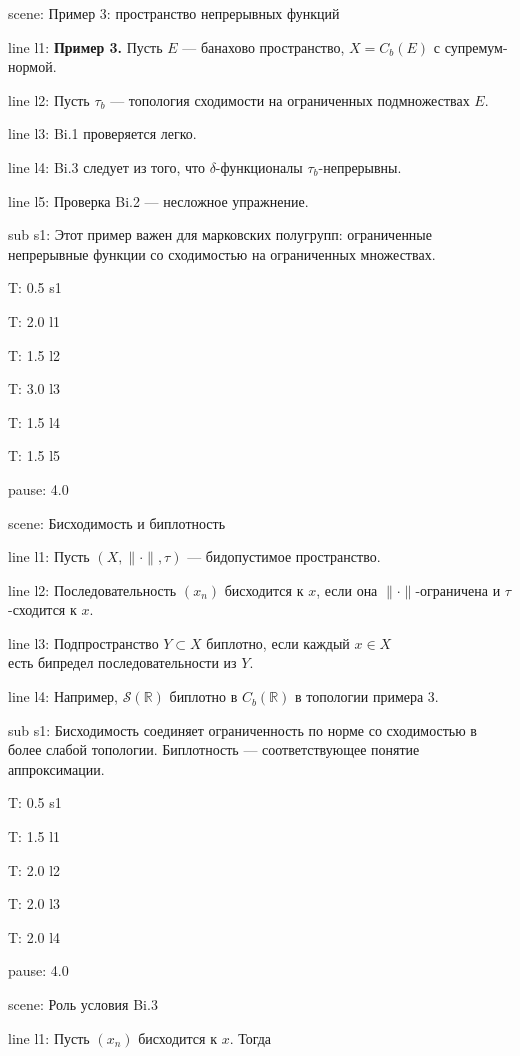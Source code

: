 \documentclass[a4paper,11pt]{article}
\newcommand{\R}{\mathbb{R}}
\begin{document}
scene: {Пример 3: пространство непрерывных функций}

line l1: {\textbf{Пример 3.} Пусть $E$ --- банахово пространство, $X=C_b(E)$ с супремум-нормой.}

line l2: {Пусть $\tau_b$ --- топология сходимости на ограниченных подмножествах $E$.}

line l3: {Bi.1 проверяется легко.}

line l4: {Bi.3 следует из того, что $\delta$-функционалы $\tau_b$-непрерывны.}

line l5: {Проверка Bi.2 --- несложное упражнение.}


sub s1: {Этот пример важен для марковских полугрупп: ограниченные непрерывные функции со сходимостью на ограниченных множествах.}


T: 0.5 s1

T: 2.0 l1

T: 1.5 l2

T: 3.0 l3

T: 1.5 l4

T: 1.5 l5

pause: 4.0



scene: {Бисходимость и биплотность}

line l1: {Пусть $(X,\|\cdot\|,\tau)$ --- бидопустимое пространство.}

line l2: {Последовательность $(x_n)$ бисходится к $x$, если она $\|\cdot\|$-ограничена и $\tau$-сходится к $x$.}

line l3: {Подпространство $Y\subset X$ биплотно, если каждый $x\in X$\\ есть бипредел последовательности из $Y$.}

line l4: {Например, $\mathcal{S}(\R)$ биплотно в $C_b(\R)$ в топологии примера 3.}


sub s1: {Бисходимость соединяет ограниченность по норме со сходимостью в более слабой топологии. Биплотность --- соответствующее понятие аппроксимации.}


T: 0.5 s1

T: 1.5 l1

T: 2.0 l2

T: 2.0 l3

T: 2.0 l4

pause: 4.0



scene: {Роль условия Bi.3}

line l1: {Пусть $(x_n)$ бисходится к $x$. Тогда}
\end{document}
